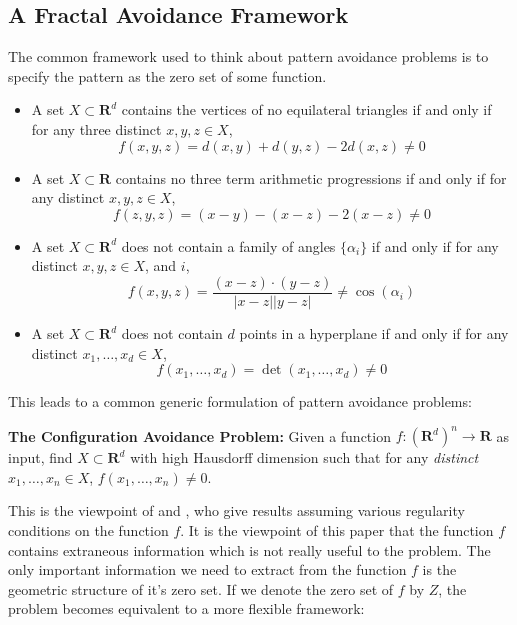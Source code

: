 \documentclass{article}
\theoremstyle{plain}
\theoremstyle{plain}
\begin{document}
\begin{multicols}{2}
\section{A Fractal Avoidance Framework}

The common framework used to think about pattern avoidance problems is to specify the pattern as the zero set of some function.
%
\begin{itemize}
	\item A set $X \subset \mathbf{R}^d$ contains the vertices of no equilateral triangles if and only if for any three distinct $x,y,z \in X$,
	\[ f(x,y,z) = d(x,y) + d(y,z) - 2d(x,z) \neq 0 \]

	\item A set $X \subset \mathbf{R}$ contains no three term arithmetic progressions if and only if for any distinct $x,y,z \in X$,
	\[ f(z,y,z) = (x - y) - (x - z) - 2(x - z) \neq 0 \]

	\item A set $X \subset \mathbf{R}^d$ does not contain a family of angles $\{ \alpha_i \}$ if and only if for any distinct $x,y,z \in X$, and $i$,
	\[ f(x,y,z) = \frac{(x - z) \cdot (y - z)}{|x - z||y - z|} \neq \cos(\alpha_i) \]

	\item A set $X \subset \mathbf{R}^d$ does not contain $d$ points in a hyperplane if and only if for any distinct $x_1, \dots, x_d \in X$,
	\[ f(x_1, \dots, x_d) = \det(x_1, \dots, x_d) \neq 0 \]
\end{itemize}
%
This leads to a common generic formulation of pattern avoidance problems:

\begin{changemargin}{0.5em}{0em}
{\bf The Configuration Avoidance Problem:} Given a function $f: (\mathbf{R}^d)^n \to \mathbf{R}$ as input, find $X \subset \mathbf{R}^d$ with high Hausdorff dimension such that for any {\it distinct} $x_1, \dots, x_n \in X$, $f(x_1, \dots, x_n) \neq 0$.
\end{changemargin}

This is the viewpoint of \cite{MalabikaRob} and \cite{Mathe}, who give results assuming various regularity conditions on the function $f$. It is the viewpoint of this paper that the function $f$ contains extraneous information which is not really useful to the problem. The only important information we need to extract from the function $f$ is the geometric structure of it's zero set. If we denote the zero set of $f$ by $Z$, the problem becomes equivalent to a more flexible framework:


\end{multicols}
\end{document}
